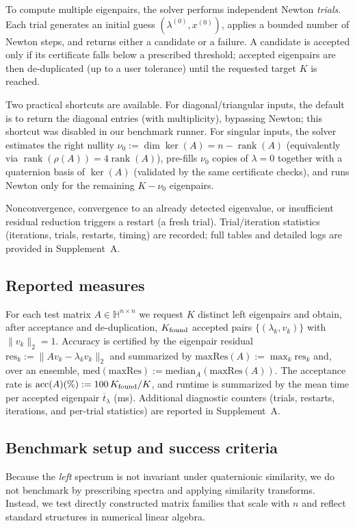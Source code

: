 \documentclass[preprint,12pt]{elsarticle}  %
\theoremstyle{definition}
\theoremstyle{definition}
\theoremstyle{definition}
\theoremstyle{definition}
\theoremstyle{definition}
\theoremstyle{remark}
\theoremstyle{remark}
\theoremstyle{remark}
\newcommand{\HH}{\mathbb{H}}
\DeclareMathOperator{\rank}{rank}
\DeclareMathOperator{\Ker}{ker}
\begin{document}
To compute multiple eigenpairs, the solver performs independent Newton \emph{trials}. Each trial generates an initial guess $(\lambda^{(0)},x^{(0)})$, applies a bounded number of Newton steps, and returns either a candidate or a failure. A candidate is accepted only if its certificate falls below a prescribed threshold; accepted eigenpairs are then de-duplicated (up to a user tolerance) until the requested target $K$ is reached.

Two practical shortcuts are available. For diagonal/triangular inputs, the default is to return the diagonal entries (with multiplicity), bypassing Newton; this shortcut was disabled in our benchmark runner. For singular inputs, the solver estimates the right nullity $\nu_0:=\dim\Ker(A)=n-\rank(A)$ (equivalently via $\rank(\rho(A))=4\rank(A)$), pre-fills $\nu_0$ copies of
$\lambda=0$ together with a quaternion basis of $\Ker(A)$ (validated by the same certificate checks), and runs Newton only for the remaining $K-\nu_0$ eigenpairs.

Nonconvergence, convergence to an already detected eigenvalue, or insufficient residual reduction triggers a restart (a fresh trial). Trial/iteration statistics (iterations, trials, restarts, timing) are recorded; full tables and detailed logs are provided in Supplement~A.

\subsection{Reported measures}
\label{app:reported_metrics}
For each test matrix $A\in\HH^{n\times n}$ we request $K$ distinct left eigenpairs and obtain, after acceptance and de-duplication,
$K_{\rm found}$ accepted pairs $\{(\lambda_k,v_k)\}$ with $\|v_k\|_2=1$.
Accuracy is certified by the eigenpair residual
$\mathrm{res}_k:=\|Av_k-\lambda_k v_k\|_2$ and summarized by
$\mathrm{maxRes}(A):=\max_k \mathrm{res}_k$ and, over an ensemble,
$\mathrm{med}(\mathrm{maxRes}):=\mathrm{median}_A(\mathrm{maxRes}(A))$.
The acceptance rate is $\mathrm{acc}(A)(\%):=100\,K_{\rm found}/K$, and runtime is summarized by the mean time per accepted
eigenpair $\overline{t}_\lambda$ (ms). Additional diagnostic counters (trials, restarts, iterations, and per-trial statistics)
are reported in Supplement~A.

\subsection{Benchmark setup and success criteria}
\label{app:benchmark_setup}
Because the \emph{left} spectrum is not invariant under quaternionic similarity, we do not benchmark by prescribing spectra and applying similarity transforms. Instead, we test directly constructed matrix families that scale with $n$ and reflect standard structures in numerical linear algebra.
\end{document}
